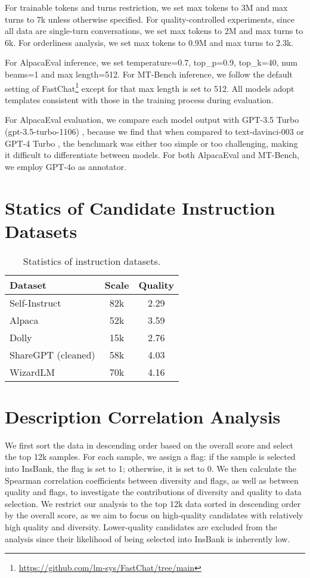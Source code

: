 For trainable tokens and turns restriction, we set max tokens to 3M and max turns to 7k unless otherwise specified. For quality-controlled experiments, since all data are single-turn conversations, we set max tokens to 2M and max turns to 6k. For orderliness analysis, we set max tokens to 0.9M and max turns to 2.3k.

For AlpacaEval inference, we set temperature=0.7, top\_p=0.9, top\_k=40, num beams=1 and max length=512. For MT-Bench inference, we follow the default setting of FastChat\footnote{\url{https://github.com/lm-sys/FastChat/tree/main}} except for that max length is set to 512. All models adopt templates consistent with those in the training process during evaluation.

For AlpacaEval evaluation, we compare each model output with GPT-3.5 Turbo (gpt-3.5-turbo-1106) \citep{openai_chatgpt}, because we find that when compared to text-davinci-003 \citep{gpt3} or GPT-4 Turbo \citep{gpt4}, the benchmark was either too simple or too challenging, making it difficult to differentiate between models. For both AlpacaEval and MT-Bench, we employ GPT-4o \citep{openai_gpt4o} as annotator.

\section{Statics of Candidate Instruction Datasets}
\begin{table}[htbp]
    \centering
    \small
    \begin{tabular}{lcc}
    \toprule
    Dataset & Scale & Quality \\
    \midrule
    Self-Instruct & 82k & 2.29 \\
    Alpaca & 52k & 3.59 \\
    Dolly & 15k & 2.76 \\
    ShareGPT (cleaned) & 58k & 4.03 \\
    WizardLM & 70k & 4.16 \\
    \bottomrule
    \end{tabular}
    \caption{Statistics of instruction datasets.}
    \label{tab: dataset-statistics}
\end{table}

\section{Description Correlation Analysis}
\label{appendix: correlation-analysis}

We first sort the data in descending order based on the overall score and select the top 12k samples. For each sample, we assign a flag: if the sample is selected into InsBank, the flag is set to 1; otherwise, it is set to 0. We then calculate the Spearman correlation coefficients between diversity and flags, as well as between quality and flags, to investigate the contributions of diversity and quality to data selection. We restrict our analysis to the top 12k data sorted in descending order by the overall score, as we aim to focus on high-quality candidates with relatively high quality and diversity. Lower-quality candidates are excluded from the analysis since their likelihood of being selected into InsBank is inherently low.

